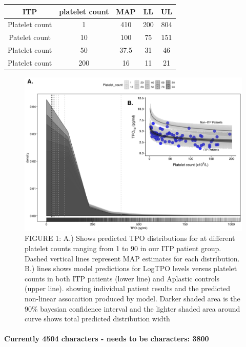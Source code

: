\documentclass[11pt]{article}
\begin{document}
\begin{center}
 \begin{tabular}{||c c c c c||}
 \hline\hline
  ITP   & platelet count & MAP & LL & UL    \\
\hline\hline
 Platelet count & 1 & 410 & 200  & 804 \\
 \hline
 Patelet count & 10 & 100 &  75 & 151 \\
 \hline
 Platelet count & 50 & 37.5 & 31 & 46 \\
 \hline
 Platelet count & 200 & 16 & 11 & 21 \\ [1ex]
 \hline
\end{tabular}
\end{center}

\begin{figure}
\includegraphics[]{ABSTRACT_v3_graph1.png}
\caption{FIGURE 1: A.) Shows predicted TPO distributions for at different platelet counts ranging from 1 to 90 in our ITP patient group. Dashed vertical lines represent MAP estimates for each distribution. B.) lines shows model predictions for LogTPO levels versus platelet counts in both ITP patients (lower line) and Aplastic controls (upper line).  showing individual patient results and the predicted non-linear assocaition produced by model. Darker shaded area is the 90\% bayesian confidence interval and the lighter shaded area around curve shows total predicted distribution width}
\end{figure}





\paragraph{}
\textbf{Currently 4504 characters - needs to be characters: 3800}
\end{document}
